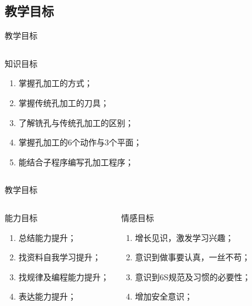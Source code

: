 \documentclass[utf8,zihao=-4,handout,smaller,aspectratio=1610]{ctexbeamer}
\begin{document}
\subsection{教学目标}
\begin{frame}{教学目标}
 \begin{columns}[onlytextwidth]
    \begin{block}{知识目标}
        \begin{enumerate}[<+->]
            \item 掌握孔加工的方式；
            \item 掌握传统孔加工的刀具；
            \item 了解铣孔与传统孔加工的区别；
            \item 掌握孔加工的6个动作与3个平面；
            \item 能结合子程序编写孔加工程序；
        \end{enumerate}
    \end{block}
 \end{columns}
\end{frame}

\begin{frame}{教学目标}
	\begin{columns}[onlytextwidth]
	
	\begin{block}{能力目标}
	\begin{enumerate}
		\item 总结能力提升；
		\item 找资料自我学习提升；
		\item 找规律及编程能力提升；
		\item 表达能力提升；
	\end{enumerate}
\end{block}
				\begin{block}{情感目标}
			\begin{enumerate}
				\item 增长见识，激发学习兴趣；
				\item 意识到做事要认真，一丝不苟；
				\item 意识到6S规范及习惯的必要性；
				\item 增加安全意识；
			\end{enumerate}
		\end{block}
	\end{columns}
\end{frame}
\end{document}
